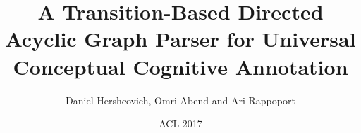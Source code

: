 \documentclass[t]{beamer}
\begin{document}
\title[A Transition-Based DAG Parser for UCCA]{A Transition-Based Directed Acyclic Graph Parser for Universal Conceptual Cognitive Annotation}
\author{Daniel Hershcovich, Omri Abend and Ari Rappoport}
\date{ACL 2017}

\begin{frame}
\titlepage
\end{frame}


\end{document}

